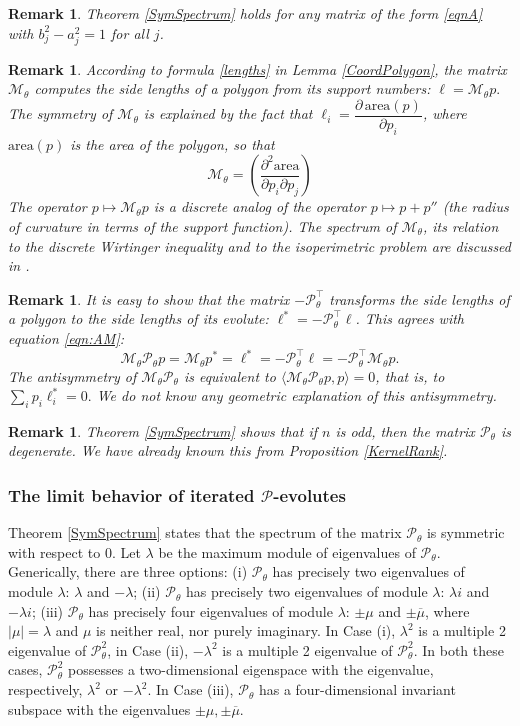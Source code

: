 \documentclass[12pt]{article}
\newtheorem{remark}[lemma]{Remark}
\newcommand{\Pev}{\mathcal{P}}
\newcommand{\Mev}{\mathcal{M}}
\begin{document}
\begin{remark}
{\rm Theorem \ref{SymSpectrum} holds for any matrix of the form \eqref{eqnA} with $b_j^2-a_j^2=1$ for all $j$. }
\end{remark}
\begin{remark}
{\rm According to formula \eqref{lengths} in Lemma \ref{CoordPolygon}, the matrix $\Mev_\theta$ computes the side lengths of a polygon from its support numbers:
$\ell = \Mev_\theta p.$ The symmetry of $\Mev_\theta$ is explained by the fact that $\ell_i = \dfrac{\partial\, \mathrm{area}(p)}{\partial p_i}$, where $\mathrm{area}(p)$ is the area of the polygon, so that
\[
\Mev_\theta = \left( \frac{\partial^2\mathrm{area}}{\partial p_i \partial p_j} \right)
\]
The operator $p \mapsto\Mev_\theta p$ is a discrete analog of the operator $p \mapsto p+p''$ (the radius of curvature in terms of the support function). The spectrum of $\Mev_\theta$, its relation to the discrete Wirtinger inequality and to the isoperimetric problem are discussed in \cite{Izm}.}
\end{remark}
\begin{remark}
{\rm It is easy to show that the matrix $-\Pev_\theta^\top$ transforms the side lengths of a polygon to the side lengths of its evolute: $\ell^* = -\Pev_\theta^\top\ell$. This agrees with  equation \eqref{eqn:AM}:
\[ \Mev_\theta\Pev_\theta p = \Mev_\theta p^* = \ell^* = -\Pev_\theta^\top \ell = -\Pev_\theta^\top \Mev_\theta p. \]
The antisymmetry of $\Mev_\theta\Pev_\theta$ is equivalent to $\langle\Mev_\theta\Pev_\theta p, p \rangle = 0$, that is, to
$\sum_i p_i \ell_i^* = 0.$ 
We do not know any geometric explanation of this antisymmetry.}
\end{remark}
\begin{remark}
{\rm Theorem \ref{SymSpectrum} shows that if $n$ is odd, then the matrix $\mathcal{P}_\theta$ is degenerate. We have already known this from Proposition \ref{KernelRank}.}
\end{remark}

\subsubsection{The limit behavior of iterated $\Pev$-evolutes}
\label{limitbehavior}

Theorem \ref{SymSpectrum} states that the spectrum of the matrix $\Pev_\theta$ is symmetric with respect to 0. Let $\lambda$ be the maximum module of eigenvalues of $\Pev_\theta$. Generically, there are three options: (i) $\Pev_\theta$ has precisely two eigenvalues of module $\lambda$: $\lambda$ and $-\lambda$; (ii) $\Pev_\theta$ has precisely two eigenvalues of module $\lambda$: $\lambda i$ and $-\lambda i$;  (iii) $\Pev_\theta$ has precisely four eigenvalues of module $\lambda$: $\pm\mu$ and $\pm\overline\mu$, where $|\mu|=\lambda$ and $\mu$ is neither real, nor purely imaginary. In Case (i), $\lambda^2$ is a multiple 2 eigenvalue of $\Pev_\theta^2$, in Case (ii), $-\lambda^2$ is a multiple 2 eigenvalue of $\Pev_\theta^2$. In both these cases, $\Pev_\theta^2$ possesses a two-dimensional eigenspace with the eigenvalue, respectively, $\lambda^2$ or $-\lambda^2$. In Case (iii), $\Pev_\theta$ has a four-dimensional invariant subspace with the eigenvalues $\pm\mu,\pm\overline\mu$. 
\end{document}
